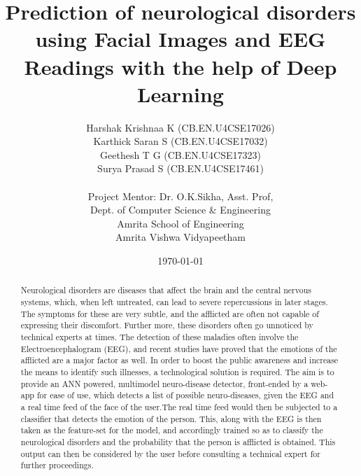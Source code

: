\documentclass[12 points, a4paper]{article} %
\date{\today} %
\begin{document}
\title{Prediction of neurological disorders using Facial Images and EEG Readings with the help of Deep Learning}

\author{
Harshak Krishnaa K (CB.EN.U4CSE17026) \\
Karthick Saran S (CB.EN.U4CSE17032) \\
Geethesh T G (CB.EN.U4CSE17323) \\
Surya Prasad S (CB.EN.U4CSE17461) \\
\\ %
Project Mentor: Dr. O.K.Sikha, Asst. Prof,\\
Dept. of Computer Science \& Engineering\\
Amrita School of Engineering\\
Amrita Vishwa Vidyapeetham
       }%
\maketitle
\thispagestyle{empty}
\begin{abstract}
Neurological disorders are diseases that affect the brain and the central nervous systems, which, when left untreated, can lead to severe repercussions in later stages. The symptoms for these are very subtle, and the afflicted are often not capable of expressing their discomfort. Further more, these disorders often go unnoticed by technical experts at times. The detection of these maladies often involve the Electroencephalogram (EEG), and recent studies have proved that the emotions of the afflicted are a major factor as well. In order to boost the public awareness and increase the means to identify such illnesses, a technological solution is required. The aim is to provide an ANN powered, multimodel neuro-disease detector, front-ended by a web-app for ease of use, which detects a list of possible neuro-diseases, given the EEG and a real time feed of the  face of the user.The real time feed would then be subjected to a classifier that detects the emotion of the person. This, along with the EEG is then taken as the feature-set for the model, and accordingly trained so as to classify the neurological disorders and the probability that the person is afflicted is obtained. This output can then be considered by the user before consulting a technical expert for further proceedings.
\end{abstract}
\end{document}
